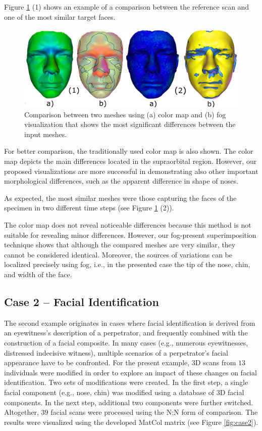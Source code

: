 \documentclass[final,5p,times]{elsarticle}
\begin{document}
Figure \ref{fig:case1} (1) shows an example of a comparison between the reference scan and one of the most similar target faces. 

\begin{figure}[htb]
	\centering
  \includegraphics[width=0.9\linewidth]{pictures/case1.png}
  \caption{\label{fig:case1}Comparison between two meshes using (a) color map and (b) fog visualization  that shows the most significant differences between the input meshes.}
\end{figure}

For better comparison, the traditionally used color map is also shown.
The color map depicts the main differences located in the supraorbital region. 
However, our proposed visualizations are more successful in demonstrating also other important morphological differences, such as the apparent difference in shape of noses.
 
As expected, the most similar meshes were those capturing the faces of the specimen in two different time steps (see Figure \ref{fig:case1} (2)).  

The color map does not reveal noticeable differences because this method is not suitable for revealing minor differences.
However, our fog-present superimposition technique shows that although the compared meshes are very similar, they cannot be considered identical. Moreover, the sources of variations can be localized precisely using fog, i.e., in the presented case the tip of the nose, chin, and width of the face.

\subsection{Case 2 -- Facial Identification}
The second example originates in cases where facial identification is derived from an eyewitness's description of a perpetrator, and frequently combined with the construction of a facial composite. 
In many cases (e.g., numerous eyewitnesses, distressed indecisive witness), multiple scenarios of a perpetrator's facial appearance have to be confronted. For the present example, 3D scans from $13$ individuals were modified in order to explore an impact of these changes on facial identification. 
Two sets of modifications were created. 
In the first step, a single facial component (e.g., nose, chin) was modified using a database of 3D facial components. 
In the next step, additional two components were further switched. 
Altogether, $39$ facial scans were processed using the N:N form of comparison. 
The results were visualized using the developed MatCol matrix (see Figure \ref{fig:case2}).
\end{document}
